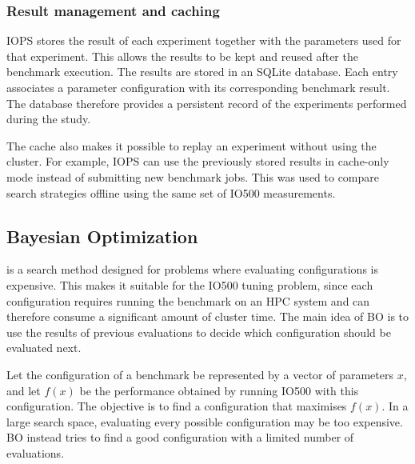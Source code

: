 \subsubsection{Result management and caching}

IOPS stores the result of each experiment together with the parameters
used for that experiment. This allows the results to be kept and reused
after the benchmark execution.   The results  are stored in an SQLite database. Each
entry associates a parameter configuration with its corresponding
benchmark result. The database therefore provides a persistent record of
the experiments performed during the study.

The cache also makes it possible to replay an experiment without using
the cluster. For example, IOPS can use the previously stored results in
cache-only mode instead of submitting new benchmark jobs. This was used
to compare search strategies offline using the same set of IO500
measurements.



\subsection{Bayesian Optimization}
\label{sec:background-bo}

 is a search method designed for
problems where evaluating  configurations is 
expensive. This makes it suitable for the IO500 tuning problem, since each
configuration requires running the benchmark on an HPC system and can
therefore consume a significant amount of cluster time.  The main idea of BO
is to use the results of previous evaluations to decide which
configuration should be evaluated next. 

Let the configuration of a benchmark be represented by a vector of
parameters $x$, and let $f(x)$ be the performance obtained by running
IO500 with this configuration. The objective is to find a configuration
that maximises $f(x)$. In a large search space, evaluating every possible
configuration may be too expensive. BO instead tries to find a good
configuration with a limited number of evaluations.

